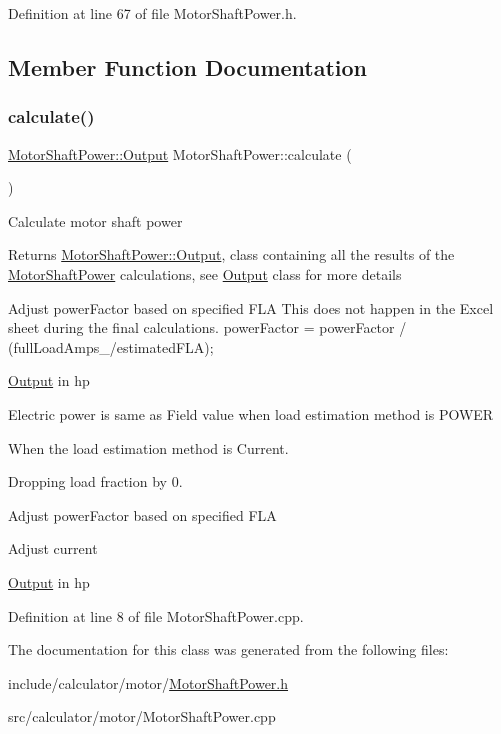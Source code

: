 Definition at line 67 of file Motor\+Shaft\+Power.\+h.



\subsection{Member Function Documentation}
\mbox{\label{class_motor_shaft_power_a6823c05e9c0aaac25f3ef7b26ba613d2}} 
\subsubsection{\texorpdfstring{calculate()}{calculate()}}
{\footnotesize\ttfamily \hyperlink{struct_motor_shaft_power_1_1_output}{Motor\+Shaft\+Power\+::\+Output} Motor\+Shaft\+Power\+::calculate (\begin{DoxyParamCaption}{ }\end{DoxyParamCaption})}

Calculate motor shaft power \begin{DoxyReturn}{Returns}
\hyperlink{struct_motor_shaft_power_1_1_output}{Motor\+Shaft\+Power\+::\+Output}, class containing all the results of the \hyperlink{class_motor_shaft_power}{Motor\+Shaft\+Power} calculations, see \hyperlink{struct_motor_shaft_power_1_1_output}{Output} class for more details 
\end{DoxyReturn}
Adjust power\+Factor based on specified F\+LA This does not happen in the Excel sheet during the final calculations. power\+Factor = power\+Factor / (full\+Load\+Amps\+\_\+/estimated\+F\+LA);

\hyperlink{struct_motor_shaft_power_1_1_output}{Output} in hp

Electric power is same as Field value when load estimation method is P\+O\+W\+ER

When the load estimation method is Current.

Dropping load fraction by 0.

Adjust power\+Factor based on specified F\+LA

Adjust current

\hyperlink{struct_motor_shaft_power_1_1_output}{Output} in hp 

Definition at line 8 of file Motor\+Shaft\+Power.\+cpp.



The documentation for this class was generated from the following files\+:\begin{DoxyCompactItemize}
\item 
include/calculator/motor/\hyperlink{_motor_shaft_power_8h}{Motor\+Shaft\+Power.\+h}\item 
src/calculator/motor/Motor\+Shaft\+Power.\+cpp\end{DoxyCompactItemize}
